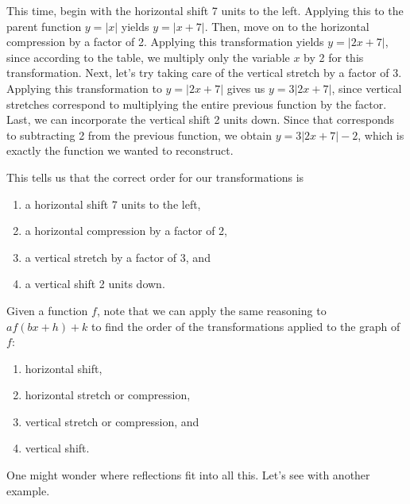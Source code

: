 \documentclass[handout, noauthor, nooutcomes]{ximera}
\begin{document}
\begin{example}
\begin{explanation}
This time, begin with the horizontal shift 7 units to the left. Applying this to the parent function $y = |x|$ yields $y = |x + 7|$. Then, move on to the horizontal compression by a factor of 2. Applying this transformation yields $y = |2x + 7|$, since according to the table, we multiply only the variable $x$ by 2 for this transformation. Next, let's try taking care of the vertical stretch by a factor of 3. Applying this transformation to $y = |2x + 7|$ gives us $y = 3|2x + 7|$, since vertical stretches correspond to multiplying the entire previous function by the factor. Last, we can incorporate the vertical shift 2 units down. Since that corresponds to subtracting 2 from the previous function, we obtain $y = 3|2x + 7| - 2$, which is exactly the function we wanted to reconstruct. 

This tells us that the correct order for our transformations is 
\begin{enumerate}
\item a horizontal shift 7 units to the left, 
\item a horizontal compression by a factor of 2,
\item a vertical stretch by a factor of 3, and
\item a vertical shift 2 units down.
\end{enumerate}
\end{explanation}
\end{example}

Given a function $f$, note that we can apply the same reasoning to $af(bx + h) + k$ to find the order of the transformations applied to the graph of $f$:
\begin{enumerate}
\item horizontal shift,
\item horizontal stretch or compression,
\item vertical stretch or compression, and 
\item vertical shift.
\end{enumerate}

One might wonder where reflections fit into all this. Let's see with another example. 
\end{document}
